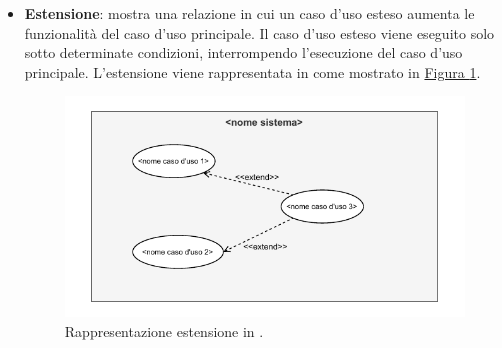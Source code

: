 \begin{itemize}
\begin{itemize}
        \item \textbf{Estensione}: mostra una relazione in cui un caso d'uso esteso aumenta le funzionalità del caso d'uso principale. Il caso d'uso esteso viene eseguito solo sotto determinate condizioni, interrompendo l'esecuzione del caso d'uso principale.
        L'estensione viene rappresentata in  come mostrato in \hyperref[fig:estensione_uml]{Figura \ref{fig:estensione_uml}}.
        \begin{figure}[H]
            \centering
            \includegraphics{Sezioni/ProcessiPrimari/Immagini/estensione_uml.pdf}
            \caption{Rappresentazione estensione in .}
            \label{fig:estensione_uml}
        \end{figure}
        

\end{itemize}
\end{itemize}
